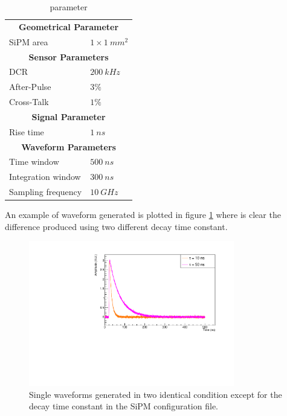 \begin{table}
	\centering
	\setlength{\tabcolsep}{18pt}
	\begin{tabular}{ll}
		\toprule
		\multicolumn{2}{c}{\textbf{Geometrical Parameter}}	\\
		SiPM area	& $1 \times 1\ mm^2$	\\
		\midrule
		\multicolumn{2}{c}{\textbf{Sensor Parameters}}	\\
		DCR			& $200 \ kHz$	\\
		After-Pulse	& $3\% $	\\
		Cross-Talk	& $1\% $	\\
		\midrule
		\multicolumn{2}{c}{\textbf{Signal Parameter}}	\\
		Rise time	& $1\ ns$	\\
		\midrule
		\multicolumn{2}{c}{\textbf{Waveform Parameters}}	\\
		Time window	& $500 \ ns$	\\
		Integration window	& $300 \ ns$	\\
		Sampling frequency	& $10\ GHz$	\\
		\bottomrule
	\end{tabular}
	\caption{parameter}
	\label{tab:SiPM_par}
\end{table}

An example of waveform generated is plotted in figure \ref{fig:diff_wf} where is clear the difference produced using two different decay time constant.

\begin{figure}
	\centering
	\includegraphics[width=0.8\textwidth]{IMG/Cap5/wf_different_conf}
	\caption{Single waveforms generated in two identical condition except for the decay time constant in the SiPM configuration file.}
	\label{fig:diff_wf}
\end{figure}


